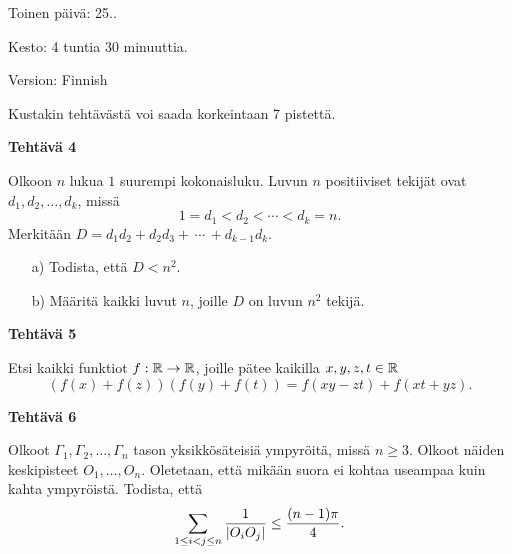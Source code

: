 \documentclass[a4paper,12pt,fleqn]{article}
\begin{document}
\newpage

\vspace*{4.5cm}

\begin{center}
Toinen p\"aiv\"a: 25..
\end{center}

\vspace*{1cm}
Kesto: 4 tuntia 30 minuuttia.

\vspace*{-4\parskip}
\begin{flushright}
Version: Finnish
\end{flushright}

\vspace*{-2\parskip}
Kustakin teht\"av\"ast\"a voi saada korkeintaan  7 pistett\"a.

\vspace*{7mm}
{\bf Teht\"av\"a 4}

Olkoon $n$ lukua $1$ suurempi kokonaisluku.
Luvun $n$ positiiviset tekij\"at ovat $d_1,d_2,\ldots,d_k$, miss\"a
	$$1=d_1<d_2<\cdots<d_k=n.$$  
Merkit\"a\"an $D=d_1d_2+d_2d_3+\,\cdots\,+d_{k-1}d_k$.

\begin{itemize}

\item[a)] Todista, ett\"a $D<n^2$.

\item[b)] M\"a\"arit\"a kaikki luvut $n$, joille $D$ on luvun $n^2$ tekij\"a.

\end{itemize}

\vspace*{7mm}
{\bf Teht\"av\"a 5}

Etsi kaikki funktiot $f:{\Bbb R}\to{\Bbb R}$, joille p\"atee
kaikilla $x,y,z,t\in{\Bbb R}$
   $$(f(x)+f(z))(f(y)+f(t))=f(xy-zt)+f(xt+yz).$$


\vspace*{7mm}
{\bf Teht\"av\"a 6}

Olkoot $\Gamma_1,\Gamma_2,\ldots,\Gamma_n$ tason 
yksikk\"os\"ateisi\"a ympyr\"oit\"a, miss\"a $n\ge 3$. 
Olkoot n\"aiden keskipisteet $O_1,\ldots,O_n$.  
Oletetaan, ett\"a mik\"a\"an suora 
ei kohtaa useampaa kuin kahta ympyr\"oist\"a.
Todista, ett\"a
   $$\sum_{1\le i<j\le n}{1\over |O_iO_j|}\le {(n-1)\pi\over 4}.$$
\end{document}
